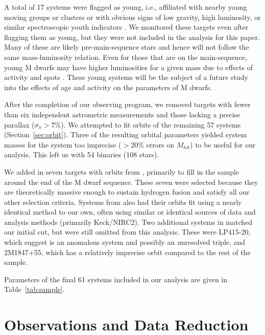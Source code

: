 \documentclass[twocolumn]{aastex62}
\begin{document}
A total of 17 systems were flagged as young, i.e., affiliated with nearby young moving groups or clusters or with obvious signs of low gravity, high luminosity, or similar spectroscopic youth indicators \citep{Shkolnik2012, Kraus2014, Gagne2014, Malo2014a, Gagne2015, 2017AJ....153...95R, 2017AJ....154...69S, Rizzuto2017, 2018MNRAS.475.2955L}. We monitored these targets even after flagging them as young, but they were not included in the analysis for this paper. Many of these are likely pre-main-sequence stars and hence will not follow the same mass-luminosity relation. Even for those that are on the main-sequence, young M dwarfs may have higher luminosities for a given mass due to effects of activity and spots \citep[e.g.,][]{2015ApJ...807....3K,Stassun2012,Somers2017}. These young systems will be the subject of a future study into the effects of age and activity on the parameters of M dwarfs. 

After the completion of our observing program, we removed targets with fewer than six independent astrometric measurements and those lacking a precise parallax ($\sigma_{\pi}>7\%$). We attempted to fit orbits of the remaining 57 systems (Section~\ref{sec:orbit}). Three of the resulting orbital parameters yielded system masses for the system too imprecise ($>$20\% errors on $M_{tot}$) to be useful for our analysis. This left us with 54 binaries (108 stars).

We added in seven targets with orbits from \citet{Dupuy2017}, primarily to fill in the sample around the end of the M dwarf sequence. These seven were selected because they are theoretically massive enough to sustain hydrogen fusion and satisfy all our other selection criteria. Systems from \citet{Dupuy2017} also had their orbits fit using a nearly identical method to our own, often using similar or identical sources of data and analysis methods (primarily Keck/NIRC2). Two additional systems in \citet{Dupuy2017} matched our initial cut, but were still omitted from this analysis. These were LP415-20, which \citet{Dupuy2017} suggest is an anomalous system and possibly an unresolved triple, and 2M1847+55, which has a relatively imprecise orbit compared to the rest of the sample.

Parameters of the final 61 systems included in our analysis are given in Table~\ref{tab:sample}.

\section{Observations and Data Reduction}\label{sec:obs} 
\end{document}
